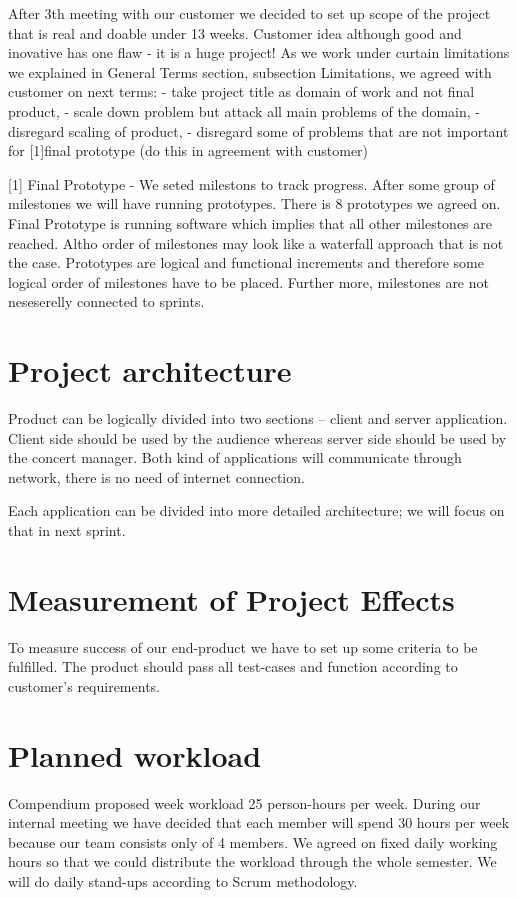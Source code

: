 \documentclass{article}
\begin{document}
After 3th meeting with our customer we decided to set up scope of the project that is real and doable under 13 weeks. Customer idea although good and inovative has one flaw - it is a huge project!
As we work under curtain limitations we explained in General Terms section, subsection Limitations, we agreed with customer on next terms:
 - take project title as domain of work and not final product,
 - scale down problem but attack all main problems of the domain,
 - disregard scaling of product,
 - disregard some of problems that are not important for [1]final prototype (do this in agreement with customer)
 
 
 [1] Final Prototype - We seted milestons to track progress. After some group of milestones we will have running prototypes. There is 8 prototypes we agreed on. Final Prototype is running software 
 which implies that all other milestones are reached. Altho order of milestones may look like a waterfall approach that is not the case. Prototypes are logical and functional increments and therefore
 some logical order of milestones have to be placed. Further more, milestones are not neseserelly connected to sprints. 

\section{Project architecture}
Product can be logically divided into two sections -- client and server application.
Client side should be used by the audience whereas server side should be used by the concert manager.
Both kind of applications will communicate through network, there is no need of internet connection.

Each application can be divided into more detailed architecture; we will focus on that in next sprint.


\section{Measurement of Project Effects}
To measure success of our end-product we have to set up some criteria to be fulfilled. The product should pass all test-cases and function according to customer's requirements.

\section{Planned workload}
Compendium proposed week workload 25 person-hours per week. During our internal meeting we have decided that each member will spend 30 hours per week because our team consists only of 4 members. We agreed on fixed daily working hours so that we could distribute the workload through the whole semester. We will do daily stand-ups according to Scrum methodology.
\end{document}
